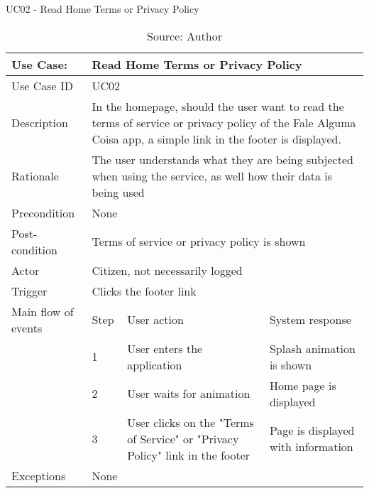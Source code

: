 \begin{table}[ht]
\centering
\caption{UC02 - Read Home Terms or Privacy Policy}
\label{uc:02}
\begin{tabular}{|p{3cm}|p{1cm}|p{5cm}|p{5cm}|}
\hline
Use Case:       & \multicolumn{3}{p{11cm}|}{Read Home Terms or Privacy Policy} \\ \hline
Use Case ID     & \multicolumn{3}{p{11cm}|}{UC02} \\ \hline
Description     & \multicolumn{3}{p{11cm}|}{In the homepage, should the user want to read the terms of service or privacy policy of the Fale Alguma Coisa app, a simple link in the footer is displayed.} \\ \hline
Rationale       & \multicolumn{3}{p{11cm}|}{The user understands what they are being subjected when using the service, as well how their data is being used} \\ \hline
Precondition    & \multicolumn{3}{p{11cm}|}{None} \\ \hline
Post-condition  & \multicolumn{3}{p{11cm}|}{Terms of service or privacy policy is shown} \\ \hline
Actor           & \multicolumn{3}{p{11cm}|}{Citizen, not necessarily logged} \\ \hline
Trigger         & \multicolumn{3}{p{11cm}|}{Clicks the footer link} \\ \hline
Main flow of events & Step  & User action & System response \\ \hline
                    & 1     & User enters the application & Splash animation is shown \\ \hline
                    & 2     & User waits for animation & Home page is displayed \\ \hline
                    & 3     & User clicks on the "Terms of Service" or "Privacy Policy" link in the footer & Page is displayed with information\\ \hline
Exceptions      & \multicolumn{3}{p{11cm}|}{None} \\ \hline
\end{tabular}
\caption*{Source: Author}
\end{table}

